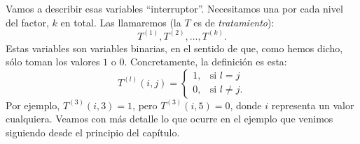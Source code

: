 Vamos a describir esas variables ``interruptor''.  Necesitamos una por cada nivel del factor, $k$ en total. Las llamaremos (la $T$ es de {\em tratamiento}):
\[T^{(1)},T^{(2)},\ldots,T^{(k)}.\]
Estas variables son variables binarias, en el sentido de que, como hemos dicho, sólo toman los valores $1$ o $0$. Concretamente, la definición es esta:
\begin{equation}
\label{cap11:ecu:DefinicionVariablesIndice}
T^{(l)}(i,j)=
\begin{cases}
1,&\mbox{si }l=j\\
0,&\mbox{si }l\neq j.
\end{cases}
\end{equation}
Por ejemplo, $T^{(3)}(i,3)=1$, pero $T^{(3)}(i,5)=0$, donde $i$ representa un valor cualquiera. Veamos con más detalle lo que ocurre en el ejemplo que venimos siguiendo desde el principio del capítulo.
